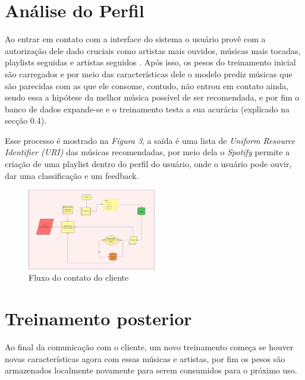 \documentclass[12pt, %
openright, 
oneside, %
a4paper,    %
brazil]{facom-ufu-abntex2}
\begin{document}
\section{Análise do Perfil}

Ao entrar em contato com a interface do sistema o usuário provê com a autorização dele dado cruciais como artistas mais ouvidos, músicas mais tocadas, playlists seguidas e artistas seguidos \cite{SpotifyLink}. Após isso, os pesos do treinamento inicial são carregados e por meio das características dele o modelo prediz músicas que são parecidas com as que ele consome, contudo, não entrou em contato ainda, sendo essa a hipótese da melhor música possível de ser recomendada, e por fim o banco de dados expande-se e o treinamento testa a sua acurácia (explicado na secção 0.4).

Esse processo é mostrado na \textit{Figura 3}, a saída é uma lista de \textit{Uniform Resource Identifier (URI)} das músicas recomendadas, por meio dela o \textit{Spotify} permite a criação de uma playlist dentro do perfil do usuário, onde o usuário pode ouvir, dar uma classificação e um feedback.


\begin{figure}[h]
  \centering
  \includegraphics[width=0.5\textwidth]{Diagrama2}
  \caption{Fluxo do contato do cliente}
\end{figure}

\section{Treinamento posterior}

Ao final da comunicação com o cliente, um novo treinamento começa se houver novas características agora com essas músicas e artistas, por fim os pesos são armazenados localmente novamente para serem consumidos para o próximo uso.



\postextual



\end{document}
